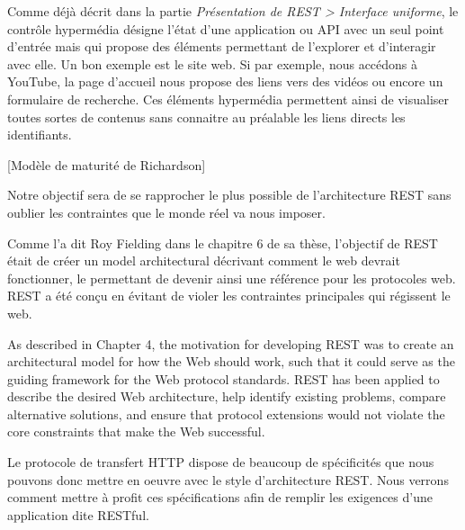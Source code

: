 \documentclass[big]{zmdocument}
\begin{document}


Comme déjà décrit dans la partie \textit{Présentation de REST > Interface uniforme}, le contrôle hypermédia désigne l'état d'une application ou API avec un seul point d'entrée mais qui propose des éléments permettant de l'explorer et d'interagir avec elle.
Un bon exemple est le site web. Si par exemple, nous accédons à YouTube, la page d'accueil nous propose des liens vers des vidéos ou encore un formulaire de recherche. Ces éléments hypermédia permettent ainsi de visualiser toutes sortes de contenus sans connaitre au préalable les liens directs les identifiants.



[Modèle de maturité de Richardson]


Notre objectif sera de se rapprocher le plus possible de l'architecture REST sans oublier les contraintes que le monde réel va nous imposer.





Comme l'a dit Roy Fielding dans le chapitre 6 de sa thèse, l'objectif de REST était de créer un model architectural décrivant comment le web devrait fonctionner, le permettant de devenir ainsi une référence pour les protocoles web. REST a été conçu en évitant de violer les contraintes principales qui régissent le web.



\begin{Quotation}
As described in Chapter 4, the motivation for developing REST was to create an architectural model for how the Web should work, such that it could serve as the guiding framework for the Web protocol standards. REST has been applied to describe the desired Web architecture, help identify existing problems, compare alternative solutions, and ensure that protocol extensions would not violate the core constraints that make the Web successful.
\end{Quotation}



Le protocole de transfert HTTP dispose de beaucoup de spécificités que nous pouvons donc mettre en oeuvre avec le style d'architecture REST. Nous verrons comment mettre à profit ces spécifications afin de remplir les exigences d'une application dite RESTful.
\end{document}
